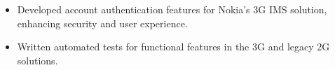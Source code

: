 \begin{itemize}
  \item Developed account authentication features for Nokia's 3G IMS solution, enhancing security and user experience.
  \item Written automated tests for functional features in the 3G and legacy 2G solutions.
\end{itemize}
\divider
